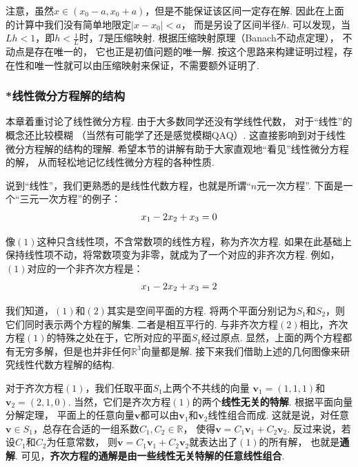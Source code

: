 注意，虽然$x \in (x_0 -a , x_0 + a)$，但是不能保证该区间一定存在解.
因此在上面的计算中我们没有简单地限定$|x-x_0|< a$，
而是另设了区间半径$h$.
可以发现，当$Lh<1$，即$h < \frac{1}{L}$时，$T$是压缩映射.
根据压缩映射原理（Banach不动点定理），
不动点是存在唯一的，
它也正是初值问题的唯一解.
按这个思路来构建证明过程，存在性和唯一性就可以由压缩映射来保证，不需要额外证明了.

\subsubsection{*线性微分方程解的结构}\par

本章着重讨论了线性微分方程.
由于大多数同学还没有学线性代数，
对于“线性”的概念还比较模糊
（当然有可能学了还是感觉模糊QAQ）.
这直接影响到对于线性微分方程解的结构的理解.
希望本节的讲解有助于大家直观地“看见”线性微分方程的解，
从而轻松地记忆线性微分方程的各种性质.

说到“线性”，我们更熟悉的是线性代数方程，也就是所谓“$n$元一次方程”.
下面是一个“三元一次方程”的例子：
\begin{equation}
    \setlength\abovedisplayskip{4pt}
    \setlength\belowdisplayskip{4pt}
    \begin{aligned}
    x_1 - 2 x_2 + x_3 = 0
    \end{aligned}
\end{equation}

像$(1)$这种只含线性项，不含常数项的线性方程，称为$\textbf{齐次方程}$.
如果在此基础上保持线性项不动，将常数项变为非零，就成为了一个对应的$\textbf{非齐次方程}$.
例如，$(1)$对应的一个非齐次方程是：
\begin{equation}
    \setlength\abovedisplayskip{4pt}
    \setlength\belowdisplayskip{4pt}
    \begin{aligned}
    x_1 - 2 x_2 + x_3 = 2
    \end{aligned}
\end{equation}

我们知道，$(1)$和$(2)$其实是空间平面的方程.
将两个平面分别记为$S_1$和$S_2$，则它们同时表示两个方程的解集.
二者是相互平行的.
与非齐次方程$(2)$相比，齐次方程$(1)$的特殊之处在于，它所对应的平面$S_1$经过原点.
显然，上面的两个方程都有无穷多解，但是也并非任何$\mathbb{R}^3$向量都是解.
接下来我们借助上述的几何图像来研究线性代数方程解的结构.

对于齐次方程$(1)$，我们任取平面$S_1$上两个不共线的向量
$\bm{v}_1 = (1,1,1)$和$\bm{v}_2 = (2,1,0)$.
当然，它们是齐次方程$(1)$的两个\textbf{线性无关的特解}.
根据平面向量分解定理，
平面上的任意向量$\bm{v}$都可以由$\bm{v}_1$和$\bm{v}_2$线性组合而成.
这就是说，对任意$\bm{v} \in S_1$，总存在合适的一组系数$C_1,C_2 \in \mathbb{R}$，
使得$\bm{v} = C_1 \bm{v}_1 + C_2 \bm{v}_2$.
反过来说，若设$C_1$和$C_2$为任意常数，
则$\bm{v} = C_1 \bm{v}_1 + C_2 \bm{v}_2$就表达出了$(1)$的所有解，
也就是\textbf{通解}.
可见，\textbf{齐次方程的通解是由一些线性无关特解的任意线性组合}.

